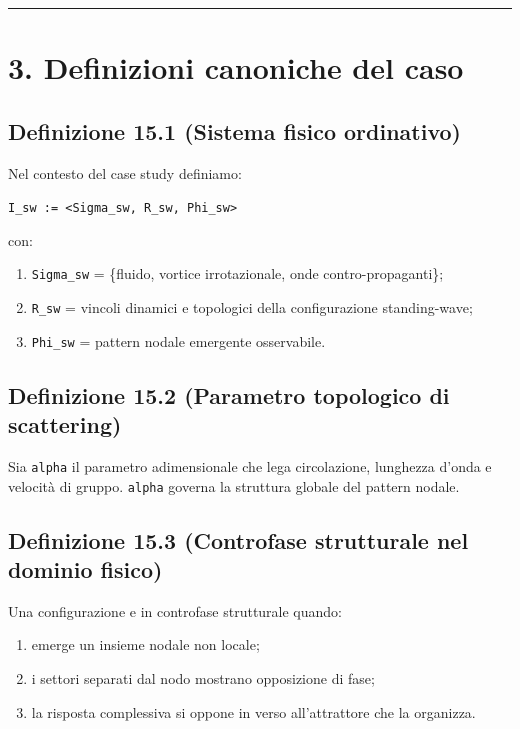 \begin{center}\rule{0.5\linewidth}{0.5pt}\end{center}

\section{3. Definizioni canoniche del caso}

\subsection{Definizione 15.1 (Sistema fisico ordinativo)}

Nel contesto del case study definiamo:

\texttt{I\_sw\ :=\ \textless{}Sigma\_sw,\ R\_sw,\ Phi\_sw\textgreater{}}

con:

\begin{enumerate}
\def\labelenumi{\arabic{enumi}.}
\tightlist
\item
  \texttt{Sigma\_sw} = \{fluido, vortice irrotazionale, onde contro-propaganti\};
\item
  \texttt{R\_sw} = vincoli dinamici e topologici della configurazione standing-wave;
\item
  \texttt{Phi\_sw} = pattern nodale emergente osservabile.
\end{enumerate}

\subsection{Definizione 15.2 (Parametro topologico di scattering)}

Sia \texttt{alpha} il parametro adimensionale che lega circolazione, lunghezza d'onda e velocità di gruppo. \texttt{alpha} governa la struttura globale del pattern nodale.

\subsection{Definizione 15.3 (Controfase strutturale nel dominio fisico)}

Una configurazione e in controfase strutturale quando:

\begin{enumerate}
\def\labelenumi{\arabic{enumi}.}
\tightlist
\item
  emerge un insieme nodale non locale;
\item
  i settori separati dal nodo mostrano opposizione di fase;
\item
  la risposta complessiva si oppone in verso all'attrattore che la organizza.
\end{enumerate}

